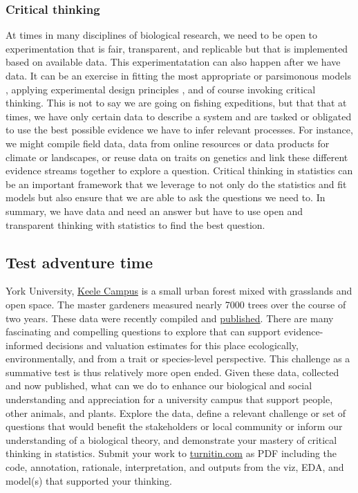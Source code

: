 \documentclass[
]{book}
\begin{document}
\hypertarget{critical-thinking-5}{%
\subsubsection*{Critical thinking}\label{critical-thinking-5}}

At times in many disciplines of biological research, we need to be open to experimentation that is fair, transparent, and replicable but that is implemented based on available data. This experimentatation can also happen after we have data. It can be an exercise in fitting the most appropriate or parsimonous models \citep{RN1873}, applying experimental design principles \citep{RN6381}, and of course invoking critical thinking. This is not to say we are going on fishing expeditions, but that that at times, we have only certain data to describe a system and are tasked or obligated to use the best possible evidence we have to infer relevant processes. For instance, we might compile field data, data from online resources or data products for climate or landscapes, or reuse data on traits on genetics and link these different evidence streams together to explore a question. Critical thinking in statistics can be an important framework that we leverage to not only do the statistics and fit models but also ensure that we are able to ask the questions we need to. In summary, we have data and need an answer but have to use open and transparent thinking with statistics to find the best question.

\hypertarget{test-adventure-time}{%
\subsection*{Test adventure time}\label{test-adventure-time}}

York University, \href{https://en.wikipedia.org/wiki/Keele_Campus_(York_University)}{Keele Campus} is a small urban forest mixed with grasslands and open space. The master gardeners measured nearly 7000 trees over the course of two years. These data were recently compiled and \href{https://knb.ecoinformatics.org/view/doi\%3A10.5063\%2FQ81BGH}{published}. There are many fascinating and compelling questions to explore that can support evidence-informed decisions and valuation estimates for this place ecologically, environmentally, and from a trait or species-level perspective. This challenge as a summative test is thus relatively more open ended. Given these data, collected and now published, what can we do to enhance our biological and social understanding and appreciation for a university campus that support people, other animals, and plants. Explore the data, define a relevant challenge or set of questions that would benefit the stakeholders or local community or inform our understanding of a biological theory, and demonstrate your mastery of critical thinking in statistics. Submit your work to \href{https://www.turnitin.com}{turnitin.com} as PDF including the code, annotation, rationale, interpretation, and outputs from the viz, EDA, and model(s) that supported your thinking.
\end{document}
